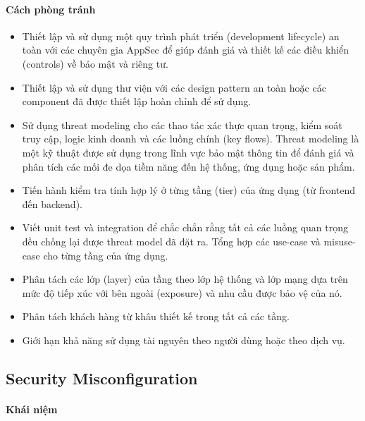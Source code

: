 \paragraph{Cách phòng tránh}

\begin{itemize}
    \item Thiết lập và sử dụng một quy trình phát triển (development lifecycle) an toàn với các chuyên gia AppSec để giúp đánh giá và thiết kế các điều khiển (controls) về bảo mật và riêng tư.
    \item Thiết lập và sử dụng thư viện với các design pattern an toàn hoặc các component đã được thiết lập hoàn chỉnh để sử dụng.
    \item Sử dụng threat modeling cho các thao tác xác thực quan trọng, kiểm soát truy cập, logic kinh doanh và các luồng chính (key flows).
    Threat modeling là một kỹ thuật được sử dụng trong lĩnh vực bảo mật thông tin để đánh giá và phân tích các mối đe dọa tiềm năng đến hệ thống, ứng dụng hoặc sản phẩm.
    \item Tiến hành kiểm tra tính hợp lý ở từng tầng (tier) của ứng dụng (từ frontend đến backend).
    \item Viết unit test và integration để chắc chắn rằng tất cả các luồng quan trọng đều chống lại được threat model đã đặt ra. Tổng hợp các use-case và misuse-case cho từng tầng của ứng dụng.
    \item Phân tách các lớp (layer) của tầng theo lớp hệ thống và lớp mạng dựa trên mức độ tiếp xúc với bên ngoài (exposure) và nhu cầu được bảo vệ của nó.
    \item Phân tách khách hàng từ khâu thiết kế trong tất cả các tầng.
    \item Giới hạn khả năng sử dụng tài nguyên theo người dùng hoặc theo dịch vụ.
\end{itemize}

\subsection{Security Misconfiguration ~\cite{chap2bib23}}

\paragraph{Khái niệm}

